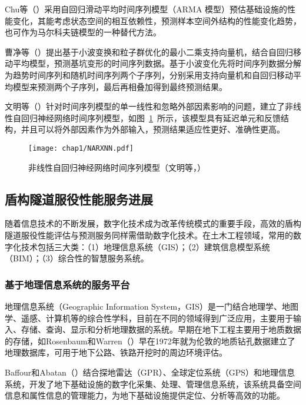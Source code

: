 Chu等（\citeyear{chu2007estimation}）采用自回归滑动平均时间序列模型（ARMA 模型）预估基础设施的性能变化，其能考虑状态空间的相互依赖性，预测样本空间外结构的性能变化趋势，也可作为马尔科夫链模型的一种替代方法。

曹净等（\citeyear{曹净2014基于}）提出基于小波变换和粒子群优化的最小二乘支持向量机，结合自回归移动平均模型，预测基坑变形的时间序列数据。基于小波变化先将时间序列数据分解为趋势时间序列和随机时间序列两个子序列，分别采用支持向量机和自回归移动平均模型来预测两个子序列，最后再相叠加得到最终预测结果。

文明等（\citeyear{文明2015地铁车站施工过程中地表沉降的}）针对时间序列模型的单一线性和忽略外部因素影响的问题，建立了非线性自回归神经网络时间序列模型，如图~\ref{fig:非线性自回归神经网络}~所示，该模型具有延迟单元和反馈结构，并且可以将外部因素作为外部输入，预测结果适应性更好、准确性更高。

\begin{figure}[!h]
	\centering
	\texttt{[image: chap1/NARXNN.pdf]}
	\caption{非线性自回归神经网络时间序列模型（文明等，\citeyear{文明2015地铁车站施工过程中地表沉降的}）}
	\label{fig:非线性自回归神经网络}
\end{figure}

\subsection{盾构隧道服役性能服务进展}
\label{chap:service-intro}

随着信息技术的不断发展，数字化技术成为改革传统模式的重要手段，高效的盾构隧道服役性能评估与预测服务同样需借助数字化技术。在土木工程领域，常用的数字化技术包括三大类：（1）地理信息系统（GIS）；（2）建筑信息模型系统（BIM）；（3）综合性的智慧服务系统。

\subsubsection{基于地理信息系统的服务平台}

地理信息系统（Geographic Information System，GIS）是一门结合地理学、地图学、遥感、计算机等的综合性学科，目前在不同的领域得到广泛应用，主要用于输入、存储、查询、显示和分析地理数据的系统。早期在地下工程主要用于地质数据的存储，如Rosenbaum和Warren（\citeyear{rosenbaum1986creating}）早在1972年就为伦敦的地质钻孔数据建立了地理数据库，可用于地下公路、铁路开挖时的周边环境评估。

Baffour和Abatan（\citeyear{baffour2002developing}）结合探地雷达（GPR）、全球定位系统（GPS）和地理信息系统，开发了地下基础设施的数字化采集、处理、管理信息系统，该系统具备空间信息和属性信息的管理能力，为地下基础设施提供定位、分析等高效的功能。

